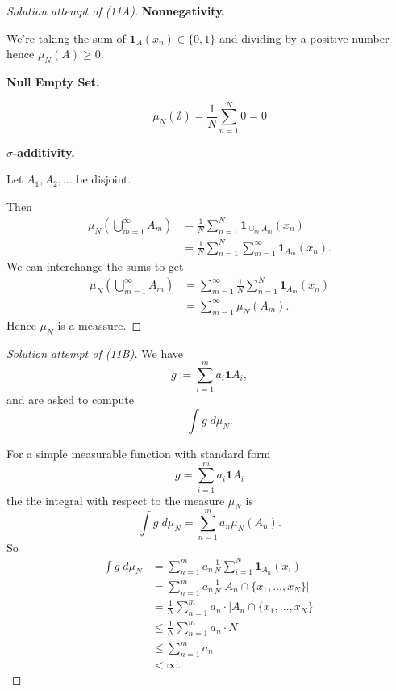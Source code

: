 \begin{proof}[Solution attempt of (11A)]
    \textbf{Nonnegativity.}

    We're taking the sum of $\textbf{1}_A(x_n) \in \{0,1\}$ 
    and dividing by a positive number hence 
    $\mu_N(A) \geq 0$.

    \textbf{Null Empty Set.}

    \[
        \mu_N(\emptyset) = \frac{1}{N}\sum_{n=1}^N 0 
        = 0
    \]

    \textbf{$\sigma$-additivity.}

    Let $A_1,A_2,\ldots$ be disjoint. 

    Then 
    \begin{align*}
        \mu_N\left( \bigcup_{m=1}^\infty A_m \right)
        &= 
        \frac{1}{N}\sum_{n=1}^N \textbf{1}_{\cup_m A_m}(x_n) 
        \\ 
        &= 
        \frac{1}{N}\sum_{n=1}^N \sum_{m=1}^\infty \textbf{1}_{A_m}
        (x_n). 
    \end{align*}
    We can interchange the sums to get 
    \begin{align*}
        \mu_N\left(\bigcup_{m=1}^\infty A_m\right)
        &= \sum_{m=1}^\infty \frac{1}{N} \sum_{n=1}^N 
        \textbf{1}_{A_m}(x_n) \\ 
        &= \sum_{m=1}^\infty \mu_N(A_m).
    \end{align*}
    Hence $\mu_N$ is a meassure. 
\end{proof}

\begin{proof}[Solution attempt of (11B)]
    We have 
    \[
        g:= \sum_{i=1}^m a_i \textbf{1}A_i,
    \]
    and are asked to compute 
    \[
        \int g \; d\mu_N.
    \]

    For a simple measurable function with standard form 
    \[
        g = \sum_{i=1}^m a_i\textbf{1}A_i
    \]
    the the integral with respect to the measure $\mu_N$ is 
    \[
        \int g \; d\mu_N 
        = 
        \sum_{n=1}^m a_n \mu_N(A_n).
    \]
    So 
    \begin{align*}
        \int g \; d\mu_N 
        &= \sum_{n=1}^m a_n \frac{1}{N} 
        \sum_{i=1}^N \textbf{1}_{A_n} (x_i)
        \\ 
        &= 
        \sum_{n=1}^m a_n \frac{1}{N} |A_n \cap \{x_1,\ldots, x_N\}|
        \\ 
        &= \frac{1}{N} \sum_{n=1}^m a_n \cdot |A_n \cap 
        \{x_1,\ldots,x_N\}|
        \\ 
        &\leq \frac{1}{N} \sum_{n=1}^m a_n \cdot N \\ 
        &\leq \sum_{n=1}^m a_n \\ 
        &< \infty.
    \end{align*}
\end{proof}


